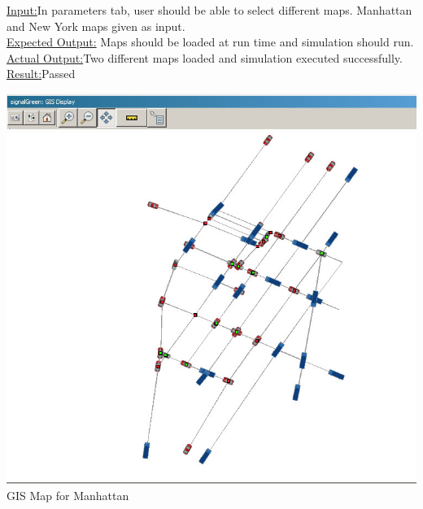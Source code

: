 \documentclass[11pt]{article}
\begin{document}
\begin{enumerate}
\begin{itemize}
\underline{Input:}In parameters tab, user should be able to select different maps. Manhattan and New York maps given as input. \hfill \\
\underline{Expected Output:} Maps should be loaded at run time and simulation should run.\hfill \\
\underline{Actual Output:}Two different maps loaded and simulation executed successfully.\hfill \\
\underline{Result:}Passed\hfill \\
\begin{table}[H]
\begin{center}
\includegraphics[scale=0.4]{manhattan_section}\hfil \\
GIS Map for Manhattan
\end{center}
\end{table}
\begin{table}[H]
\begin{center}

\end{center}
\end{table}
\end{itemize}
\end{enumerate}
\end{document}
